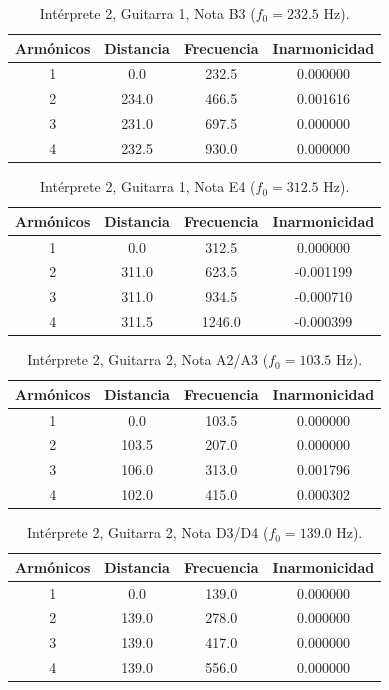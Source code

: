 \begin{table}[htbp]
  \centering
 \small
  \caption{Intérprete 2, Guitarra 1, Nota B3 ($f_0 = 232.5$ Hz).}
  \label{tab:interprete2_g1_b3}
  \begin{tabular}{cccc}
  \toprule
  Armónicos & Distancia & Frecuencia & Inarmonicidad \\
  \midrule
  1 & 0.0 & 232.5 & 0.000000 \\
  2 & 234.0 & 466.5 & 0.001616 \\
  3 & 231.0 & 697.5 & 0.000000 \\
  4 & 232.5 & 930.0 & 0.000000 \\
  \bottomrule
  \end{tabular}
\end{table}

\begin{table}[htbp]
  \centering
 \small
  \caption{Intérprete 2, Guitarra 1, Nota E4 ($f_0 = 312.5$ Hz).}
  \label{tab:interprete2_g1_e4}
  \begin{tabular}{cccc}
  \toprule
  Armónicos & Distancia & Frecuencia & Inarmonicidad \\
  \midrule
  1 & 0.0 & 312.5 & 0.000000 \\
  2 & 311.0 & 623.5 & -0.001199 \\
  3 & 311.0 & 934.5 & -0.000710 \\
  4 & 311.5 & 1246.0 & -0.000399 \\
  \bottomrule
  \end{tabular}
\end{table}

\begin{table}[htbp]
  \centering
 \small
  \caption{Intérprete 2, Guitarra 2, Nota A2/A3 ($f_0 = 103.5$ Hz).}
  \label{tab:interprete2_g2_a2_a3}
  \begin{tabular}{cccc}
  \toprule
  Armónicos & Distancia & Frecuencia & Inarmonicidad \\
  \midrule
  1 & 0.0 & 103.5 & 0.000000 \\
  2 & 103.5 & 207.0 & 0.000000 \\
  3 & 106.0 & 313.0 & 0.001796 \\
  4 & 102.0 & 415.0 & 0.000302 \\
  \bottomrule
  \end{tabular}
\end{table}

\begin{table}[htbp]
  \centering
 \small
  \caption{Intérprete 2, Guitarra 2, Nota D3/D4 ($f_0 = 139.0$ Hz).}
  \label{tab:interprete2_g2_d3_d4}
  \begin{tabular}{cccc}
  \toprule
  Armónicos & Distancia & Frecuencia & Inarmonicidad \\
  \midrule
  1 & 0.0 & 139.0 & 0.000000 \\
  2 & 139.0 & 278.0 & 0.000000 \\
  3 & 139.0 & 417.0 & 0.000000 \\
  4 & 139.0 & 556.0 & 0.000000 \\
  \bottomrule
  \end{tabular}
\end{table}


